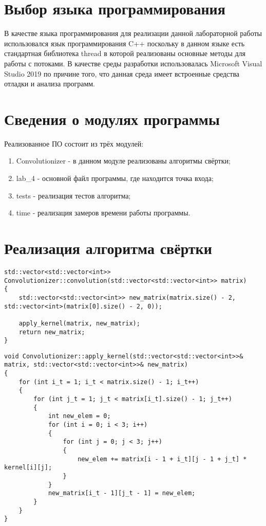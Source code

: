 \section{Выбор языка программирования}

В качестве языка программирования для реализации данной лабораторной работы использовался язык программирования C++ поскольку в данном языке есть стандартная библиотека thread в которой реализованы основные методы для работы с потоками. В качестве среды разработки использовалась Microsoft Visual Studio 2019 по причине того, что данная среда имеет встроенные средства отладки и анализа программ.

\section{Сведения о модулях программы}

Реализованное ПО состоит из трёх модулей:
\begin{enumerate}
	\item Convolutionizer - в данном модуле реализованы алгоритмы свёртки;
	\item lab\_4 - основной файл программы, где находится точка входа;
	\item tests - реализация тестов алгоритма;
	\item time - реализация замеров времени работы программы.
\end{enumerate}

\section{Реализация алгоритма свёртки}

\begin{lstlisting}[label=some-code-1,caption=Реализация алгоритма свёртки в виде метода класса Convolutionizer]
std::vector<std::vector<int>> Convolutionizer::convolution(std::vector<std::vector<int>> matrix)
{
	std::vector<std::vector<int>> new_matrix(matrix.size() - 2, std::vector<int>(matrix[0].size() - 2, 0));

	apply_kernel(matrix, new_matrix);
	return new_matrix;
}
\end{lstlisting}


\begin{lstlisting}[label=some-code-2,caption=Реализация функции применения ядра к матрице]
void Convolutionizer::apply_kernel(std::vector<std::vector<int>>& matrix, std::vector<std::vector<int>>& new_matrix)
{
	for (int i_t = 1; i_t < matrix.size() - 1; i_t++)
	{
		for (int j_t = 1; j_t < matrix[i_t].size() - 1; j_t++)
		{
			int new_elem = 0;
			for (int i = 0; i < 3; i++)
			{
				for (int j = 0; j < 3; j++)
				{
					new_elem += matrix[i - 1 + i_t][j - 1 + j_t] * kernel[i][j];
				}
			}
			new_matrix[i_t - 1][j_t - 1] = new_elem;
		}
	}
}
\end{lstlisting}

